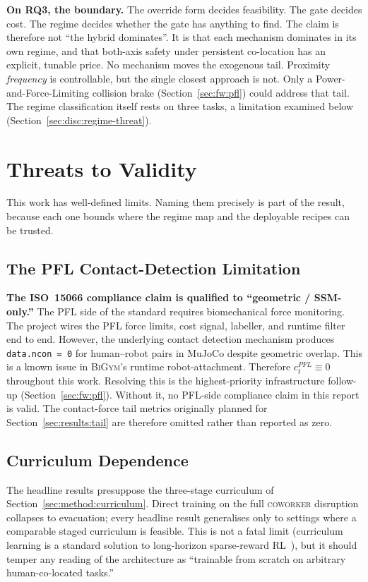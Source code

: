 \documentclass[11pt,a4paper]{report}
\newcommand{\ssm}{SSM}
\newcommand{\pfl}{PFL}
\newcommand{\iso}{ISO~15066}
\newcommand{\bigym}{\textsc{BiGym}}
\newcommand{\coworker}{\textsc{coworker}}
\begin{document}
\textbf{On RQ3, the boundary.} The override form decides feasibility.
The gate decides cost. The regime decides whether the gate has
anything to find. The claim is therefore not ``the hybrid dominates''.
It is that each mechanism dominates in its own regime, and that
both-axis safety under persistent co-location has an explicit,
tunable price. No mechanism moves the exogenous tail. Proximity
\emph{frequency} is controllable, but the single closest approach is
not. Only a Power-and-Force-Limiting collision brake
(Section~\ref{sec:fw:pfl}) could address that tail. The regime
classification itself rests on three tasks, a limitation examined
below (Section~\ref{sec:disc:regime-threat}).

\section{Threats to Validity}
\label{sec:disc:threats}

This work has well-defined limits. Naming them precisely is part of
the result, because each one bounds where the regime map and the
deployable recipes can be trusted.

\subsection{The \pfl{} Contact-Detection Limitation}
\label{sec:disc:pfl-bug}

\textbf{The \iso{} compliance claim is qualified to ``geometric /
\ssm{}-only.''} The \pfl{} side of the standard requires
biomechanical force monitoring. The project wires the \pfl{} force
limits, cost signal, labeller, and runtime filter end to end. However,
the underlying contact detection mechanism produces
\texttt{data.ncon = 0} for human--robot pairs in MuJoCo despite
geometric overlap. This is a known issue in \bigym{}'s runtime
robot-attachment. Therefore $c^{\pfl}_t \equiv 0$ throughout this
work. Resolving this is the highest-priority infrastructure follow-up
(Section~\ref{sec:fw:pfl}). Without it,
no \pfl{}-side compliance claim in this report is valid. The
contact-force tail metrics originally planned for
Section~\ref{sec:results:tail} are therefore omitted rather than
reported as zero.

\subsection{Curriculum Dependence}
\label{sec:disc:curriculum}

The headline results presuppose the three-stage curriculum of
Section~\ref{sec:method:curriculum}. Direct training on the full
\coworker{} disruption collapses to evacuation; every headline
result generalises only to settings where a comparable staged
curriculum is feasible. This is not a fatal limit (curriculum
learning is a standard solution to long-horizon sparse-reward
RL~\cite{narvekar2020curriculum,openai2019solving}), but it
should temper any reading of the architecture as ``trainable from
scratch on arbitrary human-co-located tasks.''
\end{document}
